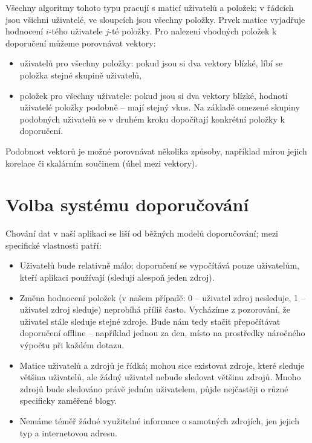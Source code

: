 Všechny algoritmy tohoto typu pracují s maticí uživatelů a položek; v řádcích jsou všichni uživatelé, ve sloupcích jsou všechny položky.
Prvek matice vyjadřuje hodnocení $i$-tého uživatele $j$-té položky.
Pro nalezení vhodných položek k doporučení můžeme porovnávat vektory:
\begin{itemize}
    \item uživatelů pro všechny položky: pokud jsou si dva vektory blízké, líbí se položka stejné skupině uživatelů,
    \item položek pro všechny uživatele: pokud jsou si dva vektory blízké, hodnotí uživatelé položky podobně -- mají stejný vkus.
        Na základě omezené skupiny podobných uživatelů se v druhém kroku dopočítají konkrétní položky k doporučení.
\end{itemize}

Podobnost vektorů je možné porovnávat několika způsoby, například mírou jejich korelace či skalárním součinem (úhel mezi vektory).

\section{Volba systému doporučování}\label{sec:volba-systemu-doporucovani}

Chování dat v naší aplikaci se liší od běžných modelů doporučování; mezi specifické vlastnosti patří:

\begin{itemize}
    \item Uživatelů bude relativně málo; doporučení se vypočítává pouze uživatelům, kteří aplikaci používají (sledují alespoň jeden zdroj).
    \item Změna hodnocení položek (v našem případě: 0 -- uživatel zdroj nesleduje, 1 -- uživatel zdroj sleduje) neprobíhá příliš často.
        Vycházíme z pozorování, že uživatel stále sleduje stejné zdroje.
        Bude nám tedy stačit přepočítávat doporučení offline -- například jednou za den, místo na prostředky náročného výpočtu při každém dotazu.
    \item Matice uživatelů a zdrojů je řídká; mohou sice existovat zdroje, které sleduje většina uživatelů, ale žádný uživatel nebude sledovat většinu zdrojů.
        Mnoho zdrojů bude sledováno právě jedním uživatelem, půjde nejčastěji o různé specificky zaměřené blogy.
    \item Nemáme téměř žádné využitelné informace o samotných zdrojích, jen jejich typ a internetovou adresu.
\end{itemize}

